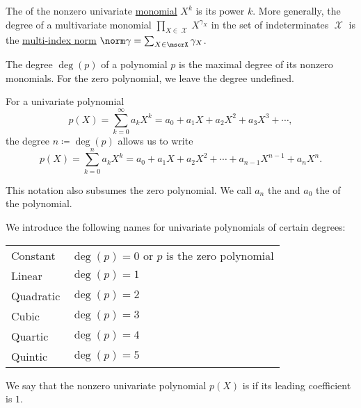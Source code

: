 \begin{definition}\label{def:polynomial_degree}
  The  of the nonzero univariate \hyperref[def:polynomial_semiring]{monomial} \( X^k \) is its power \( k \). More generally, the degree of a multivariate monomial \( \prod_{X \in \mscrX} X^{\gamma_X} \) in the set of indeterminates \( \mscrX \) is the \hyperref[def:multi_index]{multi-index norm} \( \norm \gamma = \sum_{X \in \mscrX} \gamma_X \).

  The degree \( \deg(p) \) of a polynomial \( p \) is the maximal degree of its nonzero monomials. For the zero polynomial, we leave the degree undefined.

  For a univariate polynomial
  \begin{equation*}
    p(X) = \sum_{k=0}^\infty a_k X^k = a_0 + a_1 X + a_2 X^2 + a_3 X^3 + \cdots,
  \end{equation*}
  the degree \( n \coloneqq \deg(p) \) allows us to write
  \begin{equation*}
    p(X) = \sum_{k=0}^n a_k X^k = a_0 + a_1 X + a_2 X^2 + \cdots + a_{n-1} X^{n-1} + a_n X^n.
  \end{equation*}

  This notation also subsumes the zero polynomial. We call \( a_n \) the  and \( a_0 \) the  of the polynomial.

  We introduce the following names for univariate polynomials of certain degrees:
  \begin{center}
    \begin{tabular}{l | l}
      Constant  & \( \deg(p) = 0 \) or \( p \) is the zero polynomial \\
      Linear    & \( \deg(p) = 1 \)                                   \\
      Quadratic & \( \deg(p) = 2 \)                                   \\
      Cubic     & \( \deg(p) = 3 \)                                   \\
      Quartic   & \( \deg(p) = 4 \)                                   \\
      Quintic   & \( \deg(p) = 5 \)
    \end{tabular}
  \end{center}
\end{definition}

\begin{definition}\label{def:monic_polynomial}
  We say that the nonzero univariate polynomial \( p(X) \) is  if its leading coefficient is \( 1 \).
\end{definition}


